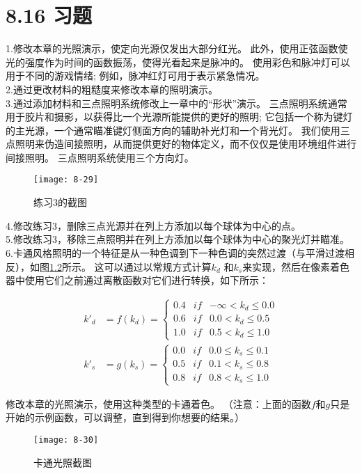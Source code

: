 \chapter{8.16 习题}
\begin{flushleft}
1.修改本章的光照演示，使定向光源仅发出大部分红光。 此外，使用正弦函数使光的强度作为时间的函数振荡，使得光看起来是脉冲的。 使用彩色和脉冲灯可以用于不同的游戏情绪; 例如，脉冲红灯可用于表示紧急情况。\\

2.通过更改材料的粗糙度来修改本章的照明演示。\\
3.通过添加材料和三点照明系统修改上一章中的“形状”演示。 三点照明系统通常用于胶片和摄影，以获得比一个光源所能提供的更好的照明; 它包括一个称为键灯的主光源，一个通常瞄准键灯侧面方向的辅助补光灯和一个背光灯。 我们使用三点照明来伪造间接照明，从而提供更好的物体定义，而不仅仅是使用环境组件进行间接照明。 三点照明系统使用三个方向灯。\\
\end{flushleft}

\begin{figure}[h]
    \label{fig:8-29}
    \texttt{[image: 8-29]}
    \centering
    \caption{练习3的截图}
\end{figure}

\begin{flushleft}
4.修改练习3，删除三点光源并在列上方添加以每个球体为中心的点。\\
5.修改练习3，移除三点照明并在列上方添加以每个球体为中心的聚光灯并瞄准。\\
6.卡通风格照明的一个特征是从一种色调到下一种色调的突然过渡（与平滑过渡相反），如图\ref{fig:8-30}所示。 这可以通过以常规方式计算$k_{d}$ 和$k_{s}$来实现，然后在像素着色器中使用它们之前通过离散函数对它们进行转换，如下所示：\\
\end{flushleft}

\begin{align*}
k'_{d}&=f(k_{d})=\left\{\begin{matrix}
0.4 & if & -\infty < k_{d} \leq 0.0 \\ 
0.6 & if & 0.0 < k_{d} \leq 0.5 \\
1.0 & if & 0.5 < k_{d} \leq 1.0 
\end{matrix}\right. \\

k'_{s}&=g(k_{s})=\left\{\begin{matrix}
0.0 & if & 0.0 \leq k_{s} \leq 0.1 \\ 
0.5 & if & 0.1 < k_{s} \leq 0.8 \\
0.8 & if & 0.8 < k_{s} \leq 1.0 
\end{matrix}\right.
\end{align*}

\begin{flushleft}
修改本章的光照演示，使用这种类型的卡通着色。 （注意：上面的函数$f$和$g$只是开始的示例函数，可以调整，直到得到你想要的结果。）
\end{flushleft}

\begin{figure}[h]
    \label{fig:8-30}
    \texttt{[image: 8-30]}
    \centering
    \caption{卡通光照截图}
\end{figure}